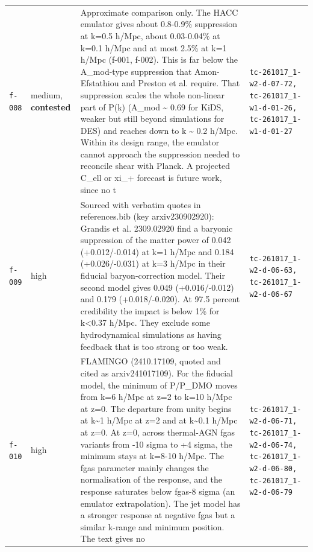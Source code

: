 \documentclass[11pt,a4paper]{article}
\begin{document}
\begin{longtable}{@{}p{}p{}p{}p{}@{}}
\texttt{f-008} & medium, \textbf{contested} & Approximate comparison only. The HACC emulator gives about 0.8-0.9\% suppression at k=0.5 h/Mpc, about 0.03-0.04\% at k=0.1 h/Mpc and at most 2.5\% at k=1 h/Mpc (f-001, f-002). This is far below the A\_mod-type suppression that Amon-Efstathiou and Preston et al. require. That suppression scales the whole non-linear part of P(k) (A\_mod \textasciitilde{} 0.69 for KiDS, weaker but still beyond simulations for DES) and reaches down to k \textasciitilde{} 0.2 h/Mpc. Within its design range, the emulator cannot approach the suppression needed to reconcile shear with Planck. A projected C\_ell or xi\_+ forecast is future work, since no t & \texttt{tc-261017\_\allowbreak{}1-w2-d-07-72,\allowbreak{} tc-261017\_\allowbreak{}1-w1-d-01-26,\allowbreak{} tc-261017\_\allowbreak{}1-w1-d-01-27} \\
\texttt{f-009} & high & Sourced with verbatim quotes in references.bib (key arxiv230902920): Grandis et al. 2309.02920 find a baryonic suppression of the matter power of 0.042 (+0.012/-0.014) at k=1 h/Mpc and 0.184 (+0.026/-0.031) at k=3 h/Mpc in their fiducial baryon-correction model. Their second model gives 0.049 (+0.016/-0.012) and 0.179 (+0.018/-0.020). At 97.5 percent credibility the impact is below 1\% for k\textless{}0.37 h/Mpc. They exclude some hydrodynamical simulations as having feedback that is too strong or too weak. & \texttt{tc-261017\_\allowbreak{}1-w2-d-06-63,\allowbreak{} tc-261017\_\allowbreak{}1-w2-d-06-67} \\
\texttt{f-010} & high & FLAMINGO (2410.17109, quoted and cited as arxiv241017109). For the fiducial model, the minimum of P/P\_DMO moves from k=6 h/Mpc at z=2 to k=10 h/Mpc at z=0. The departure from unity begins at k\textasciitilde{}1 h/Mpc at z=2 and at k\textasciitilde{}0.1 h/Mpc at z=0. At z=0, across thermal-AGN fgas variants from -10 sigma to +4 sigma, the minimum stays at k=8-10 h/Mpc. The fgas parameter mainly changes the normalisation of the response, and the response saturates below fgas-8 sigma (an emulator extrapolation). The jet model has a stronger response at negative fgas but a similar k-range and minimum position. The text gives no  & \texttt{tc-261017\_\allowbreak{}1-w2-d-06-71,\allowbreak{} tc-261017\_\allowbreak{}1-w2-d-06-74,\allowbreak{} tc-261017\_\allowbreak{}1-w2-d-06-80,\allowbreak{} tc-261017\_\allowbreak{}1-w2-d-06-79} \\

\end{longtable}
\end{document}
